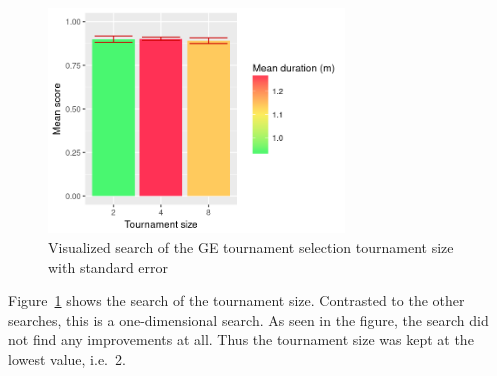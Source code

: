 \begin{figure}
    \centering
    \includegraphics[width=0.7\textwidth]{figures/ge-tournament-sampling}
    \caption[Visualized search of the GE tournament selection tournament size]{Visualized search of the \gls{GE} tournament selection tournament size with standard error}
    \label{fig:tournament-sampling}
\end{figure}

Figure~\ref{fig:tournament-sampling} shows the search of the tournament size.
Contrasted to the other searches, this is a one-dimensional search.
As seen in the figure, the search did not find any improvements at all.
Thus the tournament size was kept at the lowest value, i.e.\ 2.

